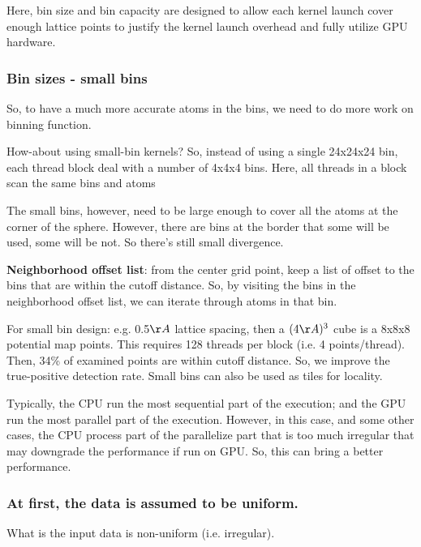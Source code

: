 Here, bin size and bin capacity are designed to allow each kernel
launch cover enough lattice points to justify the kernel launch
overhead and fully utilize GPU hardware.

\subsubsection{Bin sizes - small bins}
\label{sec:bin-sizes-small}



So, to have a much more accurate atoms in the bins, we need to do more
work on binning function.

How-about using small-bin kernels? So, instead of using a single
24x24x24 bin, each thread block deal with a number of 4x4x4
bins. Here, all threads in a block scan the same bins and atoms


The
small bins, however, need to be large enough to cover all the atoms at
the corner of the sphere. However, there are bins at the border that
some will be used, some will be not. So there's still small
divergence.



{\bf Neighborhood offset list}: from the center grid point, keep a
list of offset to the bins that are within the cutoff distance. So, by
visiting the bins in the neighborhood offset list, we can iterate
through atoms in that bin.

For small bin design: e.g. 0.5$\AA$ lattice spacing, then a $(4\AA)^3$
cube is a 8x8x8 potential map points. This requires 128 threads per
block (i.e. 4 points/thread). Then, 34\% of examined points are within
cutoff distance. So, we improve the true-positive detection
rate. Small bins can also be used as tiles for locality. 

Typically, the CPU run the most sequential part of the execution; and
the GPU run the most parallel part of the execution. However, in this
case, and some other cases, the CPU process part of the parallelize
part that is too much irregular that may downgrade the performance if
run on GPU. So, this can bring a better performance.


\subsubsection{At first, the data is assumed to be uniform.}
\label{sec:at-first-data}






What is the input data is non-uniform (i.e. irregular).

